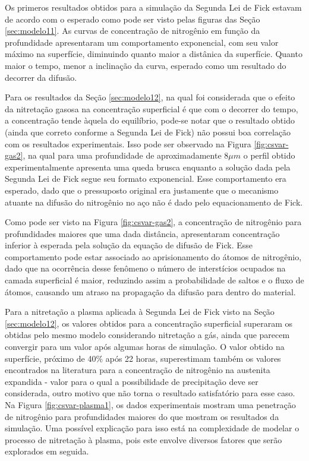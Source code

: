 Os primeros resultados obtidos para a simulação da Segunda Lei de Fick estavam de acordo com o esperado como pode ser visto pelas figuras das Seção \ref{sec:modelo11}. As curvas de concentração de nitrogênio em função da profundidade apresentaram um comportamento exponencial, com seu valor máximo na superfície, diminuindo quanto maior a distânica da superfície. Quanto maior o tempo, menor a inclinação da curva, esperado como um resultado do decorrer da difusão.

Para os resultados da Seção \ref{sec:modelo12}, na qual foi considerada que o efeito da nitretação gasosa na concentração superficial é que com o decorrer do tempo, a concentração tende àquela do equilíbrio, pode-se notar que o resultado obtido (ainda que correto conforme a Segunda Lei de Fick) não possui boa correlação com os resultados experimentais. Isso pode ser observado na Figura \ref{fig:csvar-gas2}, na qual para uma profundidade de aproximadamente 8$\mu m$ o perfil obtido experimentalmente apresenta uma queda brusca enquanto a solução dada pela Segunda Lei de Fick segue seu formato exponencial. Esse comportamento era esperado, dado que o pressuposto original era justamente que o mecanismo atuante na difusão do nitrogênio no aço não é dado pelo equacionamento de Fick.

Como pode ser visto na Figura \ref{fig:csvar-gas2}, a concentração de nitrogênio para profundidades maiores que uma dada distância, apresentaram concentração inferior à esperada pela solução da equação de difusão de Fick. Esse comportamento pode estar associado ao aprisionamento do átomos de nitrogênio, dado que na ocorrência desse fenômeno o número de interstícios ocupados na camada superficial é maior, reduzindo assim a probabilidade de saltos e o fluxo de átomos, causando um atraso na propagação da difusão para dentro do material.

Para a nitretação a plasma aplicada à Segunda Lei de Fick visto na Seção \ref{sec:modelo12}, os valores obtidos para a concentração superficial superaram os obtidas pelo mesmo modelo considerando nitretação a gás, ainda que parecem convergir para um valor após algumas horas de simulação. O valor obtido na superfície, próximo de 40\% após 22 horas, superestimam também os valores encontrados na literatura para a concentração de nitrogênio na austenita expandida - valor para o qual a possibilidade de precipitação deve ser considerada, outro motivo que não torna o resultado satisfatório para esse caso. Na Figura \ref{fig:csvar-plasma1}, os dados experimentais mostram uma penetração de nitrogênio para profundidades maiores do que mostram os resultados da simulação. Uma possível explicação para isso está na complexidade de modelar o processo de nitretação à plasma, pois este envolve diversos fatores que serão explorados em seguida.

